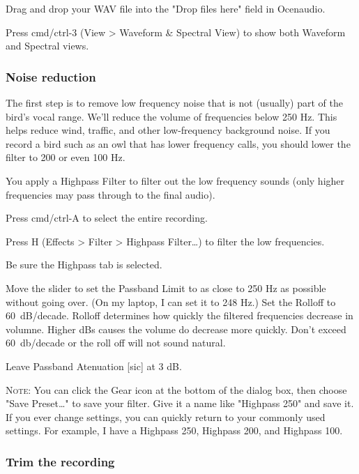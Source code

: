 \documentclass[12pt]{article}
\begin{document}
Drag and drop your WAV file into the "Drop files here" field in Ocenaudio.

Press cmd/ctrl-3 (View > Waveform \& Spectral View) to show both Waveform and Spectral views.


\subsubsection*{Noise reduction}

The first step is to remove low frequency noise that is not (usually) part of the bird's vocal range. We'll reduce the volume of frequencies below 250 Hz. This helps reduce wind, traffic, and other low-frequency background noise. If you record a bird such as an owl that has lower frequency calls, you should lower the filter to 200 or even 100 Hz.

You apply a Highpass Filter to filter out the low frequency sounds (only higher frequencies may pass through to the final audio).

Press cmd/ctrl-A to select the entire recording.

Press H (Effects > Filter > Highpass Filter\ldots) to filter the low frequencies.

Be sure the Highpass tab is selected.

Move the slider to set the Passband Limit to as close to 250 Hz as possible without going over. (On my laptop, I can set it to 248 Hz.) Set the Rolloff to 60~dB/decade. Rolloff determines how quickly the filtered frequencies decrease in volumne. Higher dBs causes the volume do decrease more quickly. Don't exceed 60~db/decade or the roll off will not sound natural.


Leave Passband Atenuation [sic] at 3 dB. 

\textsc{Note:} You can click the Gear icon at the bottom of the dialog box, then choose "Save Preset\ldots" to save your filter. Give it a name like "Highpass 250" and save it. If you ever change settings, you can quickly return to your commonly used settings. For example, I have a Highpass 250, Highpass 200, and Highpass 100.


\subsubsection*{Trim the recording}
\end{document}
